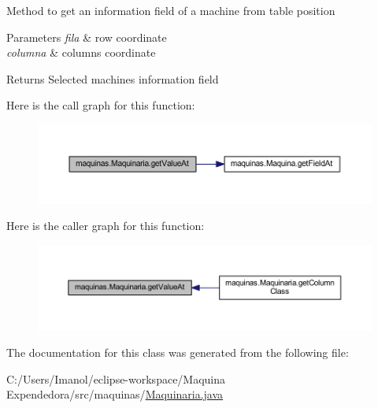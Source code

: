 Method to get an information field of a machine from table position 
\begin{DoxyParams}{Parameters}
{\em fila} & row coordinate \\
\hline
{\em columna} & columns coordinate \\
\hline
\end{DoxyParams}
\begin{DoxyReturn}{Returns}
Selected machine\textquotesingle{}s information field 
\end{DoxyReturn}
Here is the call graph for this function\+:
\nopagebreak
\begin{figure}[H]
\begin{center}
\leavevmode
\includegraphics[width=350pt]{classmaquinas_1_1_maquinaria_a0fa4ffa21f2f3cc2386634fb4c8b810e_cgraph}
\end{center}
\end{figure}
Here is the caller graph for this function\+:
\nopagebreak
\begin{figure}[H]
\begin{center}
\leavevmode
\includegraphics[width=350pt]{classmaquinas_1_1_maquinaria_a0fa4ffa21f2f3cc2386634fb4c8b810e_icgraph}
\end{center}
\end{figure}


The documentation for this class was generated from the following file\+:\begin{DoxyCompactItemize}
\item 
C\+:/\+Users/\+Imanol/eclipse-\/workspace/\+Maquina Expendedora/src/maquinas/\mbox{\hyperlink{_maquinaria_8java}{Maquinaria.\+java}}\end{DoxyCompactItemize}
